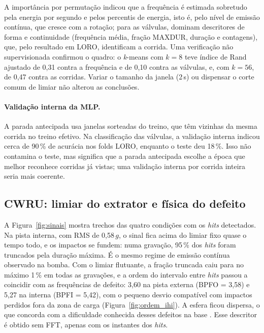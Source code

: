 \documentclass[12pt]{article}
\begin{document}
A importância por permutação indicou que a frequência é estimada sobretudo pela energia por segundo e pelos percentis de energia, isto é, pelo nível de emissão contínua, que cresce com a rotação; para as válvulas, dominam descritores de forma e continuidade (frequência média, fração MAXDUR, duração e contagens), que, pelo resultado em LORO, identificam a corrida. Uma verificação não supervisionada confirmou o quadro: o \textit{k}-means com \(k = 8\) teve índice de Rand ajustado \cite{hubert1985} de 0,31 contra a frequência e de 0,10 contra as válvulas, e, com \(k = 56\), de 0,47 contra as corridas. Variar o tamanho da janela (2\,s) ou dispensar o corte comum de limiar não alterou as conclusões.

\paragraph{Validação interna da MLP.} A parada antecipada usa janelas sorteadas do treino, que têm vizinhas da mesma corrida no treino efetivo. Na classificação das válvulas, a validação interna indicou cerca de 90\,\% de acurácia nos folds LORO, enquanto o teste deu 18\,\%. Isso não contamina o teste, mas significa que a parada antecipada escolhe a época que melhor reconhece corridas já vistas; uma validação interna por corrida inteira seria mais coerente.

\subsection{CWRU: limiar do extrator e física do defeito}
\label{subsec:res_cwru}

A Figura~\ref{fig:sinais} mostra trechos das quatro condições com os \textit{hits} detectados. Na pista interna, com RMS de 0,58\,\(g\), o sinal fica acima do limiar fixo quase o tempo todo, e os impactos se fundem: numa gravação, 95\,\% dos \textit{hits} foram truncados pela duração máxima. É o mesmo regime de emissão contínua observado na bomba. Com o limiar flutuante, a fração truncada caiu para no máximo 1\,\% em todas as gravações, e a ordem do intervalo entre \textit{hits} passou a coincidir com as frequências de defeito: 3,60 na pista externa (BPFO = 3,58) e 5,27 na interna (BPFI = 5,42), com o pequeno desvio compatível com impactos perdidos fora da zona de carga (Figura~\ref{fig:ordem_ihi}). A esfera ficou dispersa, o que concorda com a dificuldade conhecida desses defeitos na base \cite{smith2015}. Esse descritor é obtido sem FFT, apenas com os instantes dos \textit{hits}.
\end{document}
